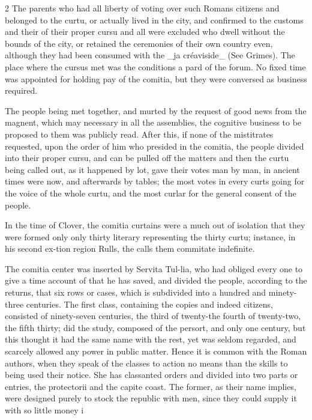 \documentclass[10pt]{article}
\begin{document}
\begin{multicols}{2}
The parents who had all liberty of voting over such Romans citizens and belonged to the curtu, or actually lived in the city, and confirmed to the customs and their of their proper cursu and all were excluded who dwell without the bounds of the city, or retained the ceremonies of their own country even, although they had been consumed with the \_ja créaviside\_ (See Grimes). The place where the cursus met was the conditions a pard of the forum. No fixed time was appointed for holding pay of the comitia, but they were conversed as business required.

The people being met together, and murted by the request of good news from the magnent, which may necessary in all the assemblies, the cognitive business to be proposed to them was publicly read. After this, if none of the mistitrates requested, upon the order of him who presided in the comitia, the people divided into their proper cursu, and can be pulled off the matters and then the curtu being called out, as it happened by lot, gave their votes man by man, in ancient times were now, and afterwards by tables; the most votes in every curts going for the voice of the whole curtu, and the most curlar for the general consent of the people.

In the time of Clover, the comitia curtains were a much out of isolation that they were formed only only thirty literary representing the thirty curtu; instance, in his second ex-tion region Rulls, the calls them commitate indefinite.

The comitia center was inserted by Servita Tul-lia, who had obliged every one to give a time account of that he has saved, and divided the people, according to the returns, that six rows or cases, which is subdivided into a hundred and minety-three centuries. The first class, containing the copies and indeed citizens, consisted of ninety-seven centuries, the third of twenty-the fourth of twenty-two, the fifth thirty; did the study, composed of the persort, and only one century, but this thought it had the same name with the rest, yet was seldom regarded, and scarcely allowed any power in public matter. Hence it is common with the Roman authors, when they speak of the classes to action no means than the skills to being used their notice. She has classanted orders and divided into two parts or entries, the protectorii and the capite coast. The former, as their name implies, were designed purely to stock the republic with men, since they could supply it with so little money i

\end{multicols}
\end{document}

